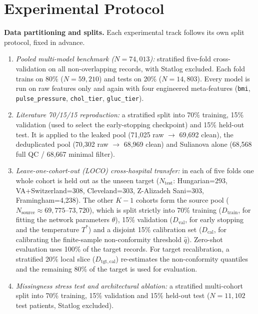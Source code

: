 \documentclass[conference]{IEEEtran}
\begin{document}
\section{Experimental Protocol}\label{sec:protocol}
\textbf{Data partitioning and splits.} Each experimental track follows its own split protocol, fixed in advance.
\begin{enumerate}
\item \emph{Pooled multi-model benchmark ($N=74{,}013$):} stratified five-fold cross-validation on all non-overlapping records, with Statlog excluded. Each fold trains on 80\% ($N=59{,}210$) and tests on 20\% ($N=14{,}803$). Every model is run on raw features only and again with four engineered meta-features (\texttt{bmi}, \texttt{pulse\_pressure}, \texttt{chol\_tier}, \texttt{gluc\_tier}).
\item \emph{Literature 70/15/15 reproduction:} a stratified split into 70\% training, 15\% validation (used to select the early-stopping checkpoint) and 15\% held-out test. It is applied to the leaked pool (71{,}025 raw $\rightarrow$ 69{,}692 clean), the deduplicated pool (70{,}302 raw $\rightarrow$ 68{,}969 clean) and Sulianova alone (68{,}568 full QC / 68{,}667 minimal filter).
\item \emph{Leave-one-cohort-out (LOCO) cross-hospital transfer:} in each of five folds one whole cohort is held out as the unseen target ($N_{\mathrm{test}}$: Hungarian=293, VA+Switzerland=308, Cleveland=303, Z-Alizadeh Sani=303, Framingham=4{,}238). The other $K-1$ cohorts form the source pool ($N_{\mathrm{source}}\approx 69{,}775$--$73{,}720$), which is split strictly into 70\% training ($D_{\mathrm{train}}$, for fitting the network parameters $\theta$), 15\% validation ($D_{\mathrm{val}}$, for early stopping and the temperature $T^*$) and a disjoint 15\% calibration set ($D_{\mathrm{cal}}$, for calibrating the finite-sample non-conformity threshold $\hat{q}$). Zero-shot evaluation uses 100\% of the target records. For target recalibration, a stratified 20\% local slice ($D_{\mathrm{tgt,cal}}$) re-estimates the non-conformity quantiles and the remaining 80\% of the target is used for evaluation.
\item \emph{Missingness stress test and architectural ablation:} a stratified multi-cohort split into 70\% training, 15\% validation and 15\% held-out test ($N=11{,}102$ test patients, Statlog excluded).
\end{enumerate}
\end{document}
